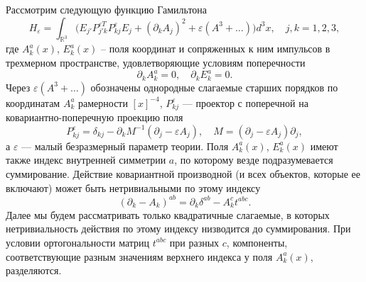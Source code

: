 \documentclass[12pt]{article}
\newcommand{\pl}{\partial}
\newcommand{\RR}{\mathbb{R}}
\newcommand{\ve}{\varepsilon}
\begin{document}
    Рассмотрим следующую функцию Гамильтона
\begin{equation}
\label{qH3}
    H_{\ve}
    = \int_{\RR^{3}} \bigl(E_{j'}P_{j'k}^{\ve T}P_{kj}^{\ve}
	E_{j} + (\pl_{k} A_{j})^{2}
	+ \ve (A^{3}+\ldots) \bigr) d^{3}x ,\quad j,k= 1,2,3,
\end{equation}
    где
$ A_{k}^{a}(x) $,
$ E_{k}^{a}(x) $ -- поля координат и сопряженных к ним импульсов
    в трехмерном пространстве,
    удовлетворяющие условиям поперечности
\begin{equation}
\label{transAE}
    \pl_{k} A_{k}^{a} = 0, \quad 
    \pl_{k} E_{k}^{a} = 0 .
\end{equation}
    Через
$ \ve (A^{3}+\ldots) $
    обозначены однородные слагаемые старших порядков по координатам
$ A_{k}^{a} $
    рамерности
$ [x]^{-4} $,
$ P_{kj}^{\ve} $ --- проектор с поперечной
    на ковариантно-поперечную проекцию поля
\begin{equation*}
    P_{kj}^{\ve}
	= \delta_{kj} - \pl_{k} M^{-1} (\pl_{j}-\ve A_{j}),
	\quad M = (\pl_{j} - \ve A_{j}) \pl_{j} ,
\end{equation*}
    а
$ \ve $ --- малый безразмерный параметр теории.
    Поля
$ A_{k}^{a}(x) $,
$ E_{k}^{a}(x) $
    имеют также индекс внутренней симметрии
$ a $,
    по которому везде подразумевается суммирование. Действие ковариантной
    производной (и всех объектов, которые ее включают)
    может быть нетривиальными по этому индексу
\begin{equation*}
    (\pl_{k}-A_{k})^{ab} = \pl_{k} \delta^{ab} - A_{k}^{c} t^{abc} .
\end{equation*}
    Далее мы будем рассматривать только квадратичные
    слагаемые, в которых нетривиальность действия по этому индексу
    низводится до суммирования. При условии ортогональности матриц
$ t^{abc} $
    при разных
$ c $,
    компоненты, соответствующие разным значениям верхнего индекса у поля
$ A_{k}^{a}(x) $,
    разделяются.
\end{document}
